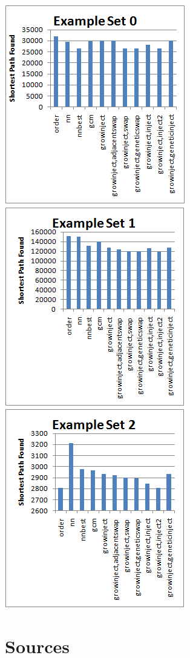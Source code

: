 \documentclass{article}
\begin{document}
\includegraphics[totalheight=0.27\textheight]{set0.png}\includegraphics[totalheight=0.27\textheight]{set1.png}\includegraphics[totalheight=0.27\textheight]{set2.png}

\section*{Sources}
\end{document}
